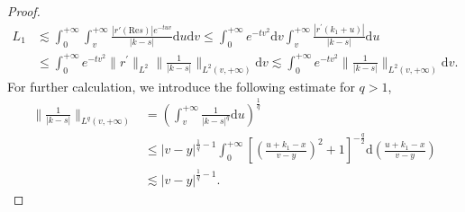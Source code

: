 \documentclass[11pt]{article}
\numberwithin{equation}{section}
\begin{document}
\begin{proof}
\begin{align*}
L_1&\lesssim\int_0^{+\infty}\int_v^{+\infty}\frac{|r'(\mathrm{Re}s)| e^{- t uv}}{|k-s|}\mathrm{d}u\mathrm{d}v\leqslant\int_0^{+\infty}e^{- t v^2}\mathrm{d}v\int_v^{+\infty}\frac{|r^\prime(k_1+u)| }{|k-s|}\mathrm{d}u\\
    &\leqslant \int_0^{+\infty}e^{- t v^2}\|r^\prime\|_{L^2}\|\frac{1}{|k-s|}\|_{L^2(v,+\infty)}\mathrm{d}v\lesssim  \int_0^{+\infty}e^{- t v^2}\|\frac{1}{|k-s|}\|_{L^2(v,+\infty)}\mathrm{d}v.
\end{align*}
For further calculation, we introduce the following estimate for $q>1$,
\begin{equation}\label{eq41}
    \begin{aligned}
    \|\frac{1}{|k-s|}\|_{L^q(v,+\infty)}&=\left(\int_v^{+\infty}\frac{1}{|k-s|^q}\mathrm{d}u\right)^{\frac{1}{q}}\\
    &\leqslant|v-y|^{\frac{1}{q}-1}\int_0^{+\infty}\left[\left(\frac{u+k_1-x}{v-y}\right)^2+1\right]^{-\frac{q}{2}}\mathrm{d}\left(\frac{u+k_1-x}{v-y}\right)\\
    &\lesssim|v-y|^{\frac{1}{q}-1}.
\end{aligned}
\end{equation}



\end{proof}
\end{document}
